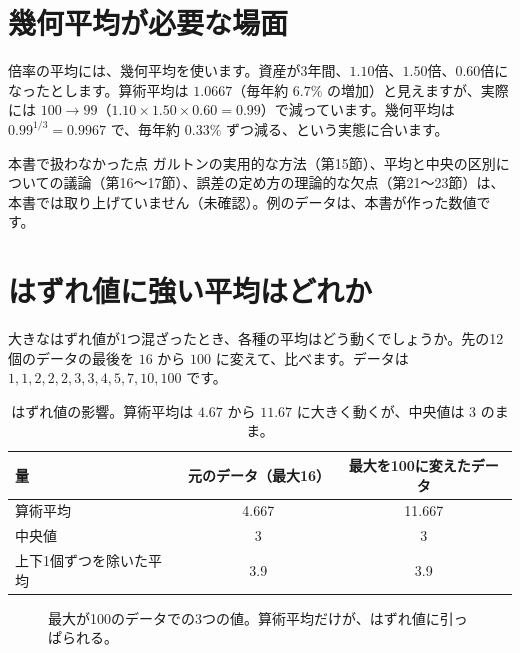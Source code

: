 \documentclass[a4paper,11pt,openany]{ltjsbook}
\begin{document}
\section{幾何平均が必要な場面}

倍率の平均には、幾何平均を使います。資産が3年間、$1.10$倍、$1.50$倍、$0.60$倍になったとします。算術平均は $1.0667$（毎年約 $6.7\%$ の増加）と見えますが、実際には $100\to99$（$1.10\times1.50\times0.60=0.99$）で減っています。幾何平均は $0.99^{1/3}=0.9967$ で、毎年約 $0.33\%$ ずつ減る、という実態に合います。

\begin{notebox}{本書で扱わなかった点}
ガルトンの実用的な方法（第15節）、平均と中央の区別についての議論（第16〜17節）、誤差の定め方の理論的な欠点（第21〜23節）は、本書では取り上げていません（未確認）。例のデータは、本書が作った数値です。
\end{notebox}

\section{はずれ値に強い平均はどれか}

大きなはずれ値が1つ混ざったとき、各種の平均はどう動くでしょうか。先の12個のデータの最後を $16$ から $100$ に変えて、比べます。データは $1,1,2,2,2,3,3,4,5,7,10,100$ です。

\begin{table}[htbp]
\centering
\begin{tabular}{lcc}
\toprule
量 & 元のデータ（最大16） & 最大を100に変えたデータ\\
\midrule
算術平均 & 4.667 & 11.667\\
中央値 & 3 & 3\\
上下1個ずつを除いた平均 & 3.9 & 3.9\\
\bottomrule
\end{tabular}
\caption{はずれ値の影響。算術平均は $4.67$ から $11.67$ に大きく動くが、中央値は $3$ のまま。}
\end{table}

\begin{figure}[htbp]
\centering
{}
\caption{最大が100のデータでの3つの値。算術平均だけが、はずれ値に引っぱられる。}
\end{figure}
\end{document}
